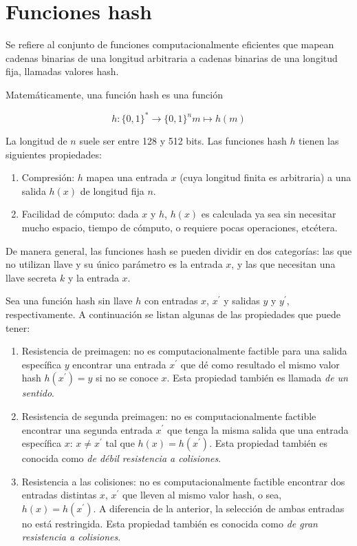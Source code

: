 %
%

\section{Funciones hash}

Se refiere al conjunto de funciones computacionalmente eficientes que
mapean cadenas binarias de una longitud arbitraria a cadenas binarias
de una longitud fija, llamadas valores hash.

Matemáticamente, una función hash es una función

\begin{equation}
  \label{funcion_hash_def}
 	h: \{0, 1\}^* \longrightarrow \{0,1\}^n
 	m \longmapsto h(m)
\end{equation}

La longitud de $n$ suele ser entre 128 y 512 bits. Las funciones hash
$h$ tienen las siguientes propiedades:
\begin{enumerate}
	\item Compresión: $h$ mapea una entrada $x$ (cuya longitud
		finita es arbitraria) a una salida $h(x)$ de longitud fija $n$.
	\item Facilidad de cómputo: dada $x$ y $h$, $h(x)$ es
		calculada ya sea sin necesitar mucho espacio, tiempo de cómputo, o
		requiere pocas operaciones, etcétera.
\end{enumerate}

De manera general, las funciones hash se pueden dividir en dos
categorías: las que no utilizan llave y su único parámetro es la entrada
$x$, y las que necesitan una llave secreta $k$ y la entrada $x$.

Sea una función hash sin llave $h$ con entradas $x$, $x^\prime$ y
salidas $y$ y $y^\prime$, respectivamente. A continuación se listan
algunas de las propiedades que puede tener:
\begin{enumerate}
	\item Resistencia de preimagen: no es computacionalmente factible
		para una salida específica $y$ encontrar una entrada $x^\prime$ que
		dé como resultado el mismo valor hash $h(x^\prime) = y$ si no se
		conoce $x$. Esta propiedad también es llamada
		\textit{de un sentido}.
	\item Resistencia de segunda preimagen: no es computacionalmente
		factible encontrar una segunda entrada $x^\prime$  que tenga la
		misma salida que una entrada específica $x$: $x \neq x^\prime$
		tal que $h(x) = h(x^\prime)$. Esta propiedad también es conocida
		como \textit{de débil resistencia a colisiones}.
	\item Resistencia a las colisiones: no es computacionalmente factible
		encontrar dos entradas distintas $x$, $x^\prime$ que lleven al
		mismo valor hash, o sea, $h(x) = h(x^\prime)$. A diferencia de la
		anterior, la selección de ambas entradas no está restringida. Esta
		propiedad también es conocida como
		\textit{de gran resistencia a colisiones}.
\end{enumerate}


